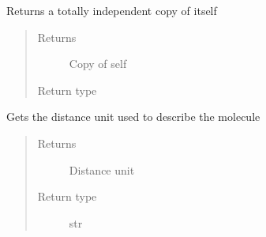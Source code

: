 \documentclass[letterpaper,10pt,english]{sphinxmanual}
\begin{document}
\begin{fulllineitems}
\begin{fulllineitems}
\begin{quote}
\begin{description}
\end{description}\end{quote}

\end{fulllineitems}


\begin{fulllineitems}
\label{\detokenize{MolOpt.molecular:MolOpt.molecular.molecular.Molecule.copy}}
\sphinxAtStartPar
Returns a totally independent copy of itself
\begin{quote}\begin{description}
\item[{Returns}] \leavevmode
\sphinxAtStartPar
Copy of self

\item[{Return type}] \leavevmode
\sphinxAtStartPar
{\hyperref[\detokenize{MolOpt.molecular:MolOpt.molecular.molecular.Molecule}]{}}

\end{description}\end{quote}

\end{fulllineitems}


\begin{fulllineitems}
\label{\detokenize{MolOpt.molecular:MolOpt.molecular.molecular.Molecule.dist_unit}}
\sphinxAtStartPar
Gets the distance unit used to describe the molecule
\begin{quote}\begin{description}
\item[{Returns}] \leavevmode
\sphinxAtStartPar
Distance unit

\item[{Return type}] \leavevmode
\sphinxAtStartPar
str

\end{description}\end{quote}

\end{fulllineitems}


\end{fulllineitems}
\end{document}

